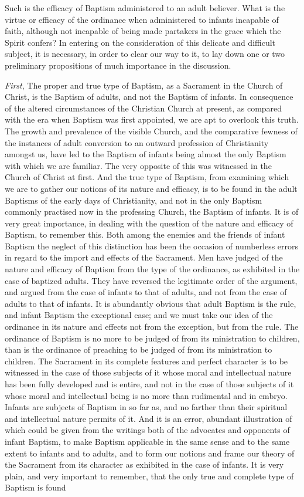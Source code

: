 \documentclass[
]{book}
\begin{document}
Such is the efficacy of Baptism administered to an adult believer. What is the virtue or efficacy of the ordinance when administered to infants incapable of faith, although not incapable of being made partakers in the grace which the Spirit confers? In entering on the consideration of this delicate and difficult subject, it is necessary, in order to clear our way to it, to lay down one or two preliminary propositions of much importance in the discussion.

\emph{First}, The proper and true type of Baptism, as a Sacrament in the Church of Christ, is the Baptism of adults, and not the Baptism of infants. In consequence of the altered circumstances of the Christian Church at present, as compared with the era when Baptism was first appointed, we are apt to overlook this truth. The growth and prevalence of the visible Church, and the comparative fewness of the instances of adult conversion to an outward profession of Christianity amongst us, have led to the Baptism of infants being almost the only Baptism with which we are familiar. The very opposite of this was witnessed in the Church of Christ at first. And the true type of Baptism, from examining which we are to gather our notions of its nature and efficacy, is to be found in the adult Baptisms of the early days of Christianity, and not in the only Baptism commonly practised now in the professing Church, the Baptism of infants. It is of very great importance, in dealing with the question of the nature and efficacy of Baptism, to remember this. Both among the enemies and the friends of infant Baptism the neglect of this distinction has been the occasion of numberless errors in regard to the import and effects of the Sacrament. Men have judged of the nature and efficacy of Baptism from the type of the ordinance, as exhibited in the case of baptized adults. They have reversed the legitimate order of the argument, and argued from the case of infants to that of adults, and not from the case of adults to that of infants. It is abundantly obvious that adult Baptism is the rule, and infant Baptism the exceptional case; and we must take our idea of the ordinance in its nature and effects not from the exception, but from the rule. The ordinance of Baptism is no more to be judged of from its ministration to children, than is the ordinance of preaching to be judged of from its ministration to children. The Sacrament in its complete features and perfect character is to be witnessed in the case of those subjects of it whose moral and intellectual nature has been fully developed and is entire, and not in the case of those subjects of it whose moral and intellectual being is no more than rudimental and in embryo. Infants are subjects of Baptism in so far as, and no farther than their spiritual and intellectual nature permits of it. And it is an error, abundant illustration of which could be given from the writings both of the advocates and opponents of infant Baptism, to make Baptism applicable in the same sense and to the same extent to infants and to adults, and to form our notions and frame our theory of the Sacrament from its character as exhibited in the case of infants. It is very plain, and very important to remember, that the only true and complete type of Baptism is found 
\end{document}
